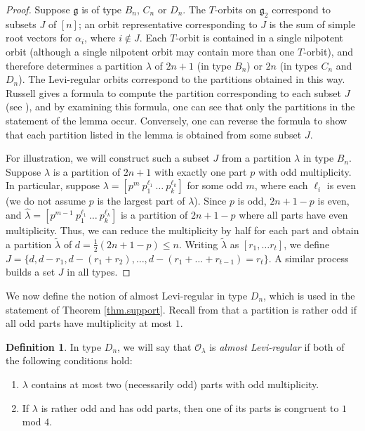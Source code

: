 \documentclass[reqno,11pt]{amsart}
\theoremstyle{remark}
\theoremstyle{remark}
\theoremstyle{definition}
\theoremstyle{definition}
\theoremstyle{definition}
\newtheorem{Def}[Thm]{Definition}
\numberwithin{equation}{section}
\newcommand{\fg}{{\mathfrak g}}
\newcommand{\ga}{\alpha}
\newcommand{\co}{\mathcal{O}}
\begin{document}
\begin{proof}  Suppose $\fg$ is of type $B_n$, $C_n$ or $D_n$. The $T$-orbits on $\fg_2$ correspond to subsets $J$ of $[n]$; an orbit representative
corresponding to $J$ is the sum of simple root vectors for $\ga_i$, where $i\notin J$.  Each $T$-orbit is contained in a single nilpotent orbit (although a single nilpotent
orbit may contain more than one $T$-orbit), and therefore determines a partition $\lambda$ of $2n+1$ (in type $B_n$) or $2n$ (in types $C_n$ and $D_n$).  The Levi-regular orbits correspond to the partitions obtained
in this way.  Russell gives a formula to compute the partition corresponding to each subset $J$ (see \cite[Prop.~3.1]{Russell}), and
by examining this formula, one can see that only the partitions in the statement of the lemma occur.  Conversely, one can reverse the formula to show
that each partition listed in the lemma is obtained from some subset $J$.

For illustration, we will construct such a subset $J$ from a partition $\lambda$ in type $B_n$.  Suppose $\lambda$ is a partition of $2n+1$ with exactly one part $p$ with odd multiplicity. In particular, suppose $\lambda = [p^{m}\ p_1^{\ell_1}\ \dots\ p_k^{\ell_k}]$ for some odd $m$, where each $\ell_i$ is even (we do not assume $p$ is the largest
part of $\lambda$).  Since $p$ is odd, $2n+1-p$ is even, and $\widehat{\lambda} = [p^{m-1}\ p_1^{\ell_1}\ \dots\ p_k^{\ell_k}]$ is a partition of $2n+1-p$ where all parts have even multiplicity.  Thus, we can reduce the multiplicity by half for each part and obtain a partition $\widetilde{\lambda}$ of $d = \frac{1}{2}(2n+1-p)  \leq n$.  Writing $\widetilde{\lambda}$ as $[r_1, \dots r_t]$, we define 
$J = \{ d, d-r_1, d-(r_1+r_2), \dots, d-(r_1+\dots +r_{t-1})=r_t\}$.  A similar process builds a set $J$ in all types.
\end{proof}

We now define the notion of almost Levi-regular in type $D_n$, which is used in the statement of Theorem \ref{thm.support}.
 Recall from \cite[Section 6.1]{NilOrbBk} that a partition is rather odd if all odd parts have multiplicity at most $1$.

 \begin{Def} \label{def:almost}
 In type $D_n$, we will say
 that $\co_{\lambda}$ is {\em almost Levi-regular} if both of the following conditions hold:
 \begin{enumerate} 
 \item $\lambda$ contains at most two (necessarily odd) parts with odd multiplicity.
\item If $\lambda$ is rather odd and has odd parts, then one of its parts is congruent to $1$ mod $4$.
\end{enumerate}
 \end{Def}
 
\end{document}
